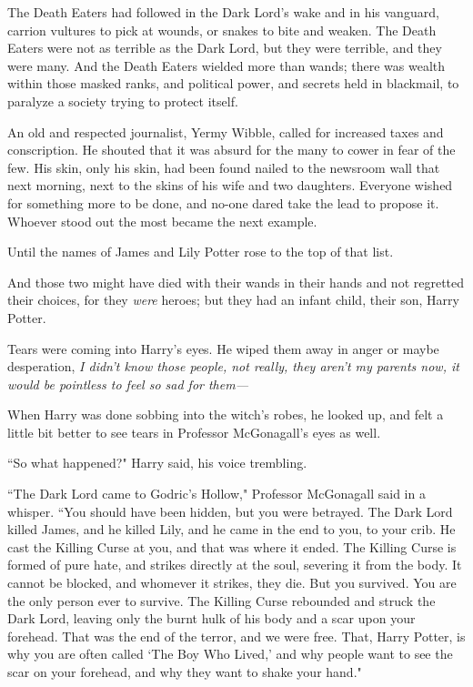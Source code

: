 The Death Eaters had followed in the Dark Lord's wake and in his vanguard, carrion vultures to pick at wounds, or snakes to bite and weaken. The Death Eaters were not as terrible as the Dark Lord, but they were terrible, and they were many. And the Death Eaters wielded more than wands; there was wealth within those masked ranks, and political power, and secrets held in blackmail, to paralyze a society trying to protect itself.

An old and respected journalist, Yermy Wibble, called for increased taxes and conscription. He shouted that it was absurd for the many to cower in fear of the few. His skin, only his skin, had been found nailed to the newsroom wall that next morning, next to the skins of his wife and two daughters. Everyone wished for something more to be done, and no-one dared take the lead to propose it. Whoever stood out the most became the next example.

Until the names of James and Lily Potter rose to the top of that list.

And those two might have died with their wands in their hands and not regretted their choices, for they \emph{were} heroes; but they had an infant child, their son, Harry Potter.

Tears were coming into Harry's eyes. He wiped them away in anger or maybe desperation, \emph{I didn't know those people, not really, they aren't my parents \emph{now}, it would be pointless to feel so sad for them—}

When Harry was done sobbing into the witch's robes, he looked up, and felt a little bit better to see tears in Professor McGonagall's eyes as well.

``So what happened?" Harry said, his voice trembling.

``The Dark Lord came to Godric's Hollow," Professor McGonagall said in a whisper. ``You should have been hidden, but you were betrayed. The Dark Lord killed James, and he killed Lily, and he came in the end to you, to your crib. He cast the Killing Curse at you, and that was where it ended. The Killing Curse is formed of pure hate, and strikes directly at the soul, severing it from the body. It cannot be blocked, and whomever it strikes, they die. But you survived. You are the only person ever to survive. The Killing Curse rebounded and struck the Dark Lord, leaving only the burnt hulk of his body and a scar upon your forehead. That was the end of the terror, and we were free. That, Harry Potter, is why you are often called `The Boy Who Lived,' and why people want to see the scar on your forehead, and why they want to shake your hand."

